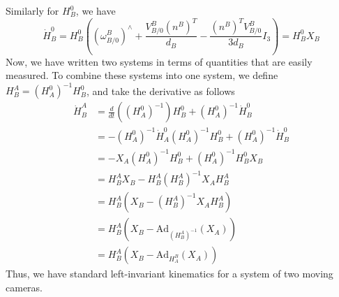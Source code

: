 \documentclass[a4paper]{article}
\begin{document}
Similarly for $H_B^0$, we have
\[
    \dot{H}_B^0 = H_B^0 \left( \left( \omega_{B/0}^B \right)^{\wedge} +  \frac{V_{B/0}^B(n^B)^T}{d_B}-\frac{(n^B)^TV_{B/0}^B}{3d_B}I_3 \right) = H_B^0X_B
\]
Now, we have written two systems in terms of quantities that are easily measured. To combine these systems into one system, we define $H_B^A = (H_A^0)^{-1}H_B^0$, and take the derivative as follows
\[
    \begin{aligned}
        \dot{H}_B^A &= \frac{d}{dt} \left({(H_A^0)^{-1}}\right)H_B^0 + (H_A^0)^{-1}\dot{H}_B^0 \\
                    &= -(H_A^0)^{-1}\dot{H}_A^0(H_A^0)^{-1}H_B^0 + (H_A^0)^{-1}\dot{H}_B^0 \\
                    &= -X_A(H_A^0)^{-1}H_B^0 + (H_A^0)^{-1}H_B^0X_B \\
                    &= H_B^AX_B - H_B^A(H_B^A)^{-1}X_AH_B^A \\
                    &= H_B^A \left( X_B - (H_B^A)^{-1}X_AH_B^A \right) \\
                    &= H_B^A \left( X_B - \text{Ad}_{(H_B^A)^{-1}}(X_A) \right) \\
                    &= H_B^A \left( X_B - \text{Ad}_{H_A^B}(X_A) \right)

    \end{aligned}
\]
Thus, we have standard left-invariant kinematics for a system of two moving cameras. 
\end{document}
